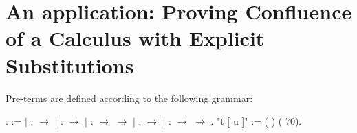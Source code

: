 
\begin{coqdoccode}
\end{coqdoccode}
\section{An application: Proving Confluence of a Calculus with Explicit Substitutions}

\begin{coqdoccode}
\coqdocemptyline
\coqdocemptyline
\end{coqdoccode}
Pre-terms are defined according to the following grammar: \begin{coqdoccode}
\coqdocnoindent
{}  :  :=\coqdoceol
\coqdocindent{1.00em}
\ensuremath{|}  :  \ensuremath{\rightarrow} \coqdoceol
\coqdocindent{1.00em}
\ensuremath{|}  :  \ensuremath{\rightarrow} \coqdoceol
\coqdocindent{1.00em}
\ensuremath{|}   :  \ensuremath{\rightarrow}  \ensuremath{\rightarrow} \coqdoceol
\coqdocindent{1.00em}
\ensuremath{|}   :  \ensuremath{\rightarrow} \coqdoceol
\coqdocindent{1.00em}
\ensuremath{|}  :  \ensuremath{\rightarrow}  \ensuremath{\rightarrow} .\coqdoceol
\coqdocemptyline
\coqdocnoindent
{} "t [ u ]" := (  ) (  70).\coqdoceol
\end{coqdoccode}
